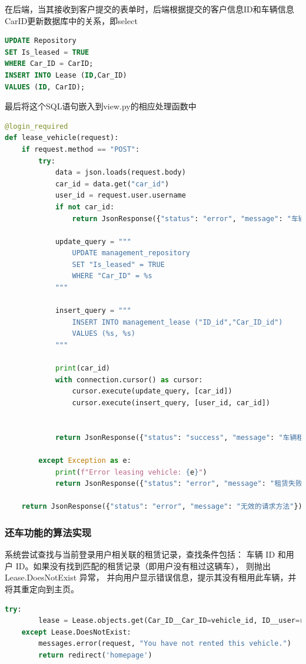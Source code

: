 \documentclass[UTF8,a4paper,12pt]{ctexart}
\begin{document}
在后端，当其接收到客户提交的表单时，后端根据提交的客户信息ID和车辆信息CarID更新数据库中的关系，即select
\begin{lstlisting}[language=SQL]
UPDATE Repository
SET Is_leased = TRUE
WHERE Car_ID = CarID;
INSERT INTO Lease (ID,Car_ID)
VALUES (ID, CarID);
\end{lstlisting}
最后将这个SQL语句嵌入到view.py的相应处理函数中
\begin{lstlisting}[language=Python]
@login_required
def lease_vehicle(request):
    if request.method == "POST":
        try:
            data = json.loads(request.body)
            car_id = data.get("car_id")  
            user_id = request.user.username  
            if not car_id:
                return JsonResponse({"status": "error", "message": "车辆ID不能为空"})

            update_query = """
                UPDATE management_repository
                SET "Is_leased" = TRUE
                WHERE "Car_ID" = %s
            """

            insert_query = """
                INSERT INTO management_lease ("ID_id","Car_ID_id")
                VALUES (%s, %s)
            """
            
            print(car_id)
            with connection.cursor() as cursor:
                cursor.execute(update_query, [car_id]) 
                cursor.execute(insert_query, [user_id, car_id])  
            

            return JsonResponse({"status": "success", "message": "车辆租赁成功！"})

        except Exception as e:
            print(f"Error leasing vehicle: {e}")
            return JsonResponse({"status": "error", "message": "租赁失败，请稍后再试。"})

    return JsonResponse({"status": "error", "message": "无效的请求方法"})    
\end{lstlisting}


\subsubsection{还车功能的算法实现}

系统尝试查找与当前登录用户相关联的租赁记录，查找条件包括：
车辆 ID 和用户 ID。如果没有找到匹配的租赁记录（即用户没有租过这辆车），
则抛出 Lease.DoesNotExist 异常，
并向用户显示错误信息，提示其没有租用此车辆，并将其重定向到主页。

\begin{lstlisting}[language=Python]
    try:
        lease = Lease.objects.get(Car_ID__Car_ID=vehicle_id, ID__user=request.user)
    except Lease.DoesNotExist:
        messages.error(request, "You have not rented this vehicle.")
        return redirect('homepage')
\end{lstlisting}
\end{document}
